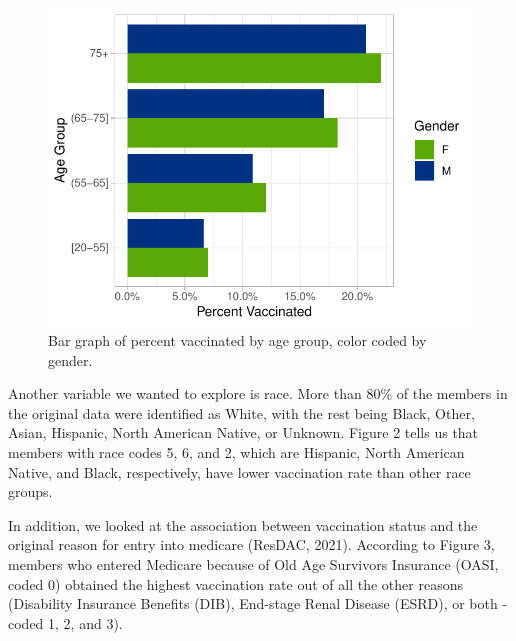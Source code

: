 \documentclass[
  12pt,
]{article}
\begin{document}
\begin{figure}[H]

{\centering \includegraphics{report_files/figure-latex/unnamed-chunk-3-1} 

}

\caption{Bar graph of percent vaccinated by age group, color coded by gender.}\label{fig:unnamed-chunk-3}
\end{figure}

Another variable we wanted to explore is race. More than 80\% of the
members in the original data were identified as White, with the rest
being Black, Other, Asian, Hispanic, North American Native, or Unknown.
Figure 2 tells us that members with race codes 5, 6, and 2, which are
Hispanic, North American Native, and Black, respectively, have lower
vaccination rate than other race groups.

In addition, we looked at the association between vaccination status and
the original reason for entry into medicare (ResDAC, 2021). According to
Figure 3, members who entered Medicare because of Old Age Survivors
Insurance (OASI, coded 0) obtained the highest vaccination rate out of
all the other reasons (Disability Insurance Benefits (DIB), End-stage
Renal Disease (ESRD), or both - coded 1, 2, and 3).
\end{document}
